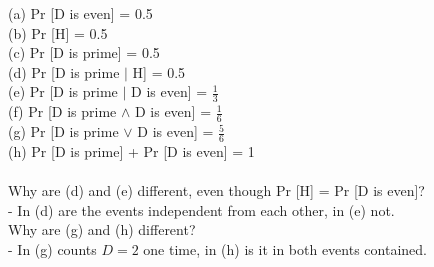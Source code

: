 \documentclass[12pt,a4paper]{article}
\begin{document}
 \exercise
(a) Pr [D is even] = 0.5\\
(b) Pr [H] = 0.5\\
(c) Pr [D is prime] = 0.5\\
(d) Pr [D is prime \(\vert\) H] = 0.5\\
(e) Pr [D is prime \(\vert\) D is even] = \(\frac{1}{3}\)\\
(f) Pr [D is prime \(\land \) D is even] = \(\frac{1}{6}\) \\
(g) Pr [D is prime \(\lor \) D is even] = \(\frac{5}{6}\) \\
(h) Pr [D is prime] + Pr [D is even] = 1\\\\
Why are (d) and (e) different, even though Pr [H] = Pr [D is even]?\\
\indent - In (d) are the events independent from each other, in (e) not.\\
Why are (g) and (h) different?\\
\indent - In (g) counts \(D=2\) one time, in (h) is it in both events contained.

%  
%
%
%  
%
%  
%	
%
%
%
%
%
%
%
%
%
%
\end{document}
